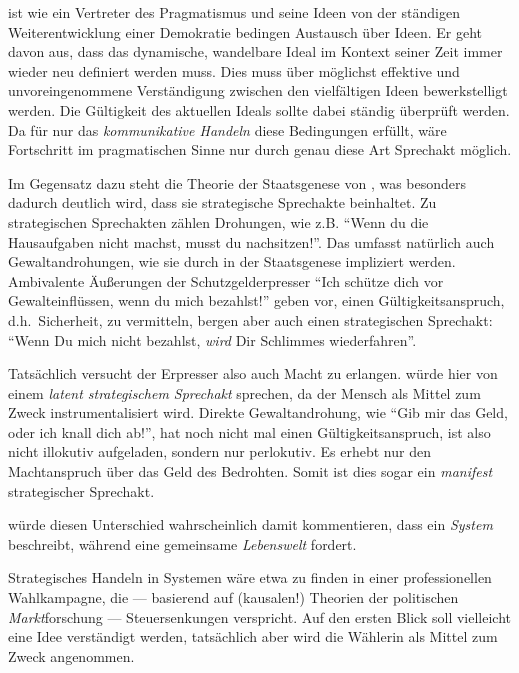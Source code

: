 \citeauthor{Dewey2010} ist wie \citeauthor{Habermas-1998-aa} ein Vertreter des Pragmatismus und seine Ideen von der ständigen Weiterentwicklung einer Demokratie bedingen Austausch über Ideen.
Er geht davon aus, dass das dynamische, wandelbare Ideal im Kontext seiner Zeit immer wieder neu definiert werden muss.
Dies muss über möglichst effektive und unvoreingenommene Verständigung zwischen den vielfältigen Ideen bewerkstelligt werden.
Die Gültigkeit des aktuellen Ideals sollte dabei ständig überprüft werden.
Da für \citeauthor{Habermas-1998-aa} nur das \emph{kommunikative Handeln} diese Bedingungen erfüllt, wäre Fortschritt im pragmatischen Sinne nur durch genau diese Art Sprechakt möglich.

Im Gegensatz dazu steht die Theorie der Staatsgenese von \citeauthor{Tilly-1985-aa}, was besonders dadurch deutlich wird, dass sie strategische Sprechakte beinhaltet.
Zu strategischen Sprechakten zählen Drohungen, wie z.B. ``Wenn du die Hausaufgaben nicht machst, musst du nachsitzen!''.
Das umfasst natürlich auch Gewaltandrohungen, wie sie durch \citeauthor{Tilly-1985-aa} in der Staatsgenese impliziert werden.
Ambivalente Äußerungen der Schutzgelderpresser ``Ich schütze dich vor Gewalteinflüssen, wenn du mich bezahlst!'' geben vor, einen Gültigkeitsanspruch, d.h.\ Sicherheit, zu vermitteln, bergen aber auch einen strategischen Sprechakt: ``Wenn Du mich nicht bezahlst, \emph{wird} Dir Schlimmes wiederfahren''.

Tatsächlich versucht der Erpresser also auch Macht zu erlangen.
\citeauthor{Habermas-1998-aa} würde hier von einem \emph{latent strategischem Sprechakt} sprechen, da der Mensch als Mittel zum Zweck instrumentalisiert wird.
Direkte Gewaltandrohung, wie ``Gib mir das Geld, oder ich knall dich ab!'', hat noch nicht mal einen Gültigkeitsanspruch, ist also nicht illokutiv aufgeladen, sondern nur perlokutiv.
Es erhebt nur den Machtanspruch über das Geld des Bedrohten.
Somit ist dies sogar ein \emph{manifest} strategischer Sprechakt.

\citeauthor{Habermas-1998-aa} würde diesen Unterschied wahrscheinlich damit kommentieren, dass \citeauthor{Tilly-1985-aa} ein \emph{System} beschreibt, während \citeauthor{Dewey2010} eine gemeinsame \emph{Lebenswelt} fordert.

Strategisches Handeln in Systemen wäre etwa zu finden in einer professionellen Wahlkampagne, die --- basierend auf (kausalen!) Theorien der politischen \emph{Markt}forschung --- Steuersenkungen verspricht.
Auf den ersten Blick soll vielleicht eine Idee verständigt werden, tatsächlich aber wird die Wählerin als Mittel zum Zweck angenommen.

